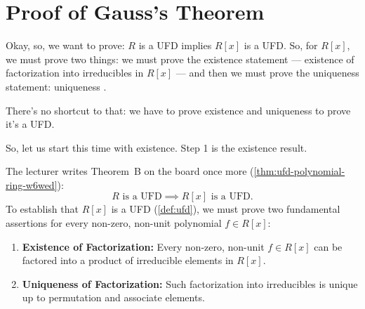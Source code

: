 \begin{hidden}
\end{hidden}

\section{Proof of Gauss's Theorem}

\begin{speech}[00:20:34 - 00:21:44]
Okay, so, we want to prove: $R$ is a UFD implies $R[x]$ is a UFD.  So, for $R[x]$, we must prove two things: we must prove the existence statement --- existence of factorization into irreducibles in $R[x]$  --- and then we must prove the uniqueness statement: uniqueness .

There's no shortcut to that: we have to prove existence and uniqueness to prove it's a UFD.

So, let us start this time with existence. Step 1 is the existence result. 
\end{speech}

\begin{content}
The lecturer writes Theorem~B on the board once more (\cref{thm:ufd-polynomial-ring-w6wed}):
\[
R \text{ is a UFD} \implies R[x] \text{ is a UFD}.
\]
To establish that $R[x]$ is a UFD (\cref{def:ufd}), we must prove two fundamental assertions for every non-zero, non-unit polynomial $f \in R[x]$:
\begin{enumerate}[label=\textbf{(\arabic*)}]
    \item \textbf{Existence of Factorization:} Every non-zero, non-unit $f \in R[x]$ can be factored into a product of irreducible elements in $R[x].$
    \item \textbf{Uniqueness of Factorization:} Such factorization into irreducibles is unique up to permutation and associate elements.
\end{enumerate}
\end{content}

